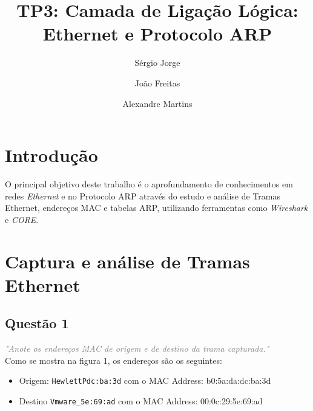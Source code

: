 \documentclass{llncs}
\newcommand{\questionE}[1]{\textcolor{gray}{\textit{"#1"}}}
\begin{document}
\mainmatter
\title{TP3: Camada de Ligação Lógica: Ethernet e Protocolo ARP}


\author{Sérgio Jorge \and João Freitas \and Alexandre Martins}




\date{}


\maketitle

\section{Introdução}
\hspace{3mm} 

O principal objetivo deste trabalho é o aprofundamento de conhecimentos em redes \textit{Ethernet} e no Protocolo ARP através do estudo e análise de Tramas Ethernet, endereços MAC e tabelas ARP, utilizando ferramentas como \textit{Wireshark} e \textit{CORE}. 

\clearpage

\section{Captura e análise de Tramas Ethernet}

\subsection{Questão 1}
\hspace{3mm} 
\questionE{Anote os endereços MAC de origem e de destino da trama capturada.}\\ 

Como se mostra na figura 1, os endereços são os seguintes:

\begin{itemize}

    \item Origem: \verb|HewlettPdc:ba:3d| com o MAC Address: b0:5a:da:dc:ba:3d
    
    \item Destino \verb|Vmware_5e:69:ad| com o MAC Address: 00:0c:29:5e:69:ad
    
\end{itemize}
\end{document}
